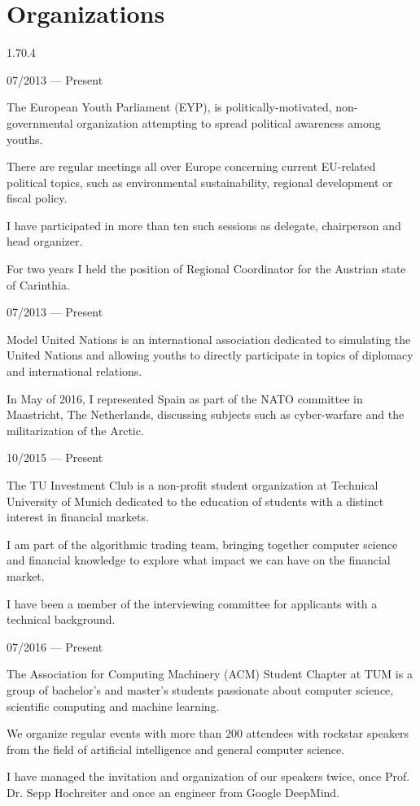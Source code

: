 \section{Organizations}{1.7}{0.4}
\begin{entry}{}{}{07/2013 --- Present}
  \item The European Youth Parliament (EYP), is politically-motivated, non-governmental organization attempting to spread political awareness among youths.
  \item There are regular meetings all over Europe concerning current EU-related political topics, such as environmental sustainability, regional development or fiscal policy.
  \item I have participated in more than ten such sessions as delegate, chairperson and head organizer.
  \item For two years I held the position of Regional Coordinator for the Austrian state of Carinthia.
\end{entry}
\begin{entry}{}{}{07/2013 --- Present}
  \item Model United Nations is an international association dedicated to simulating the United Nations and allowing youths to directly participate in topics of diplomacy and international relations.
  \item In May of 2016, I represented Spain as part of the NATO committee in Maastricht, The Netherlands, discussing subjects such as cyber-warfare and the militarization of the Arctic.
\end{entry}
\begin{entry}{}{}{10/2015 --- Present}
  \item The TU Investment Club is a non-profit student organization at Technical University of Munich dedicated to the education of students with a distinct interest in financial markets.
  \item I am part of the algorithmic trading team, bringing together computer science and financial knowledge to explore what impact we can have on the financial market.
  \item I have been a member of the interviewing committee for applicants with a technical background.
\end{entry}
\begin{entry}{}{}{07/2016 --- Present}
  \item The Association for Computing Machinery (ACM) Student Chapter at TUM is a group of bachelor's and master's students passionate about computer science, scientific computing and machine learning.
  \item We organize regular events with more than 200 attendees with rockstar speakers from the field of artificial intelligence and general computer science.
  \item I have managed the invitation and organization of our speakers twice, once Prof. Dr. Sepp Hochreiter and once an engineer from Google DeepMind.
\end{entry}

